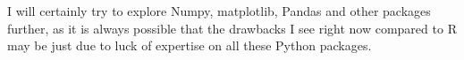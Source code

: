 \documentclass[a4paper, 11pt]{article} %
\begin{document}
I will certainly try to explore Numpy, matplotlib, Pandas and other
packages further, as it is always possible that the drawbacks I see
right now compared to R may be just due to luck of expertise on all
these Python packages. 






\end{document}
